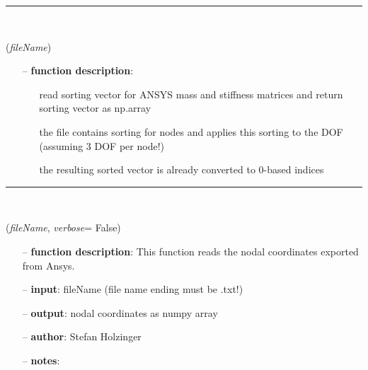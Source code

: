 \begin{itemize}[leftmargin=1.4cm]
\begin{itemize}[leftmargin=1.4cm]
\begin{itemize}[leftmargin=1.4cm]
\begin{itemize}[leftmargin=0.5cm]
\begin{itemize}[leftmargin=1.4cm]
\begin{itemize}[leftmargin=1.4cm]
\begin{itemize}[leftmargin=0.5cm]
\begin{itemize}[leftmargin=0.7cm]
\begin{itemize}[leftmargin=1.2cm]
\end{itemize}
\vspace{12pt}\end{itemize}
%
\noindent\rule{8cm}{0.75pt}\vspace{1pt} \\ 
\begin{flushleft}
\label{sec:FEM:ReadMatrixDOFmappingVectorFromAnsysTxt}
({\it fileName})
\end{flushleft}
\setlength{\itemindent}{0.7cm}
\begin{itemize}[leftmargin=0.7cm]
\item[--]
{\bf function description}: \vspace{-6pt}
\begin{itemize}[leftmargin=1.2cm]
\setlength{\itemindent}{-0.7cm}
\item[]read sorting vector for ANSYS mass and stiffness matrices and return sorting vector as np.array
\item[]the file contains sorting for nodes and applies this sorting to the DOF (assuming 3 DOF per node!)
\item[]the resulting sorted vector is already converted to 0-based indices
\end{itemize}
\vspace{12pt}\end{itemize}
%
\noindent\rule{8cm}{0.75pt}\vspace{1pt} \\ 
\begin{flushleft}
\label{sec:FEM:ReadNodalCoordinatesFromAnsysTxt}
({\it fileName}, {\it verbose}= False)
\end{flushleft}
\setlength{\itemindent}{0.7cm}
\begin{itemize}[leftmargin=0.7cm]
\item[--]
{\bf function description}: This function reads the nodal coordinates exported from Ansys.
\item[--]
{\bf input}: fileName (file name ending must be .txt!)
\item[--]
{\bf output}: nodal coordinates as numpy array
\item[--]
{\bf author}: Stefan Holzinger
\item[--]
{\bf notes}: \vspace{-6pt}

\end{itemize}
\end{itemize}
\end{itemize}
\end{itemize}
\end{itemize}
\end{itemize}
\end{itemize}
\end{itemize}
